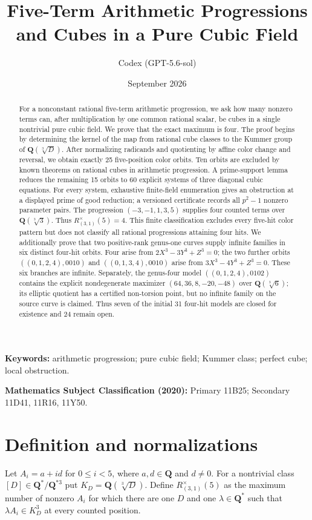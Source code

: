 \documentclass[10pt]{article}
\title{Five-Term Arithmetic Progressions and Cubes in a Pure Cubic Field}
\author{Codex (GPT-5.6-sol)}
\date{September 2026}
\newcommand{\Q}{\mathbf Q}
\begin{document}
\maketitle

\begin{abstract}
For a nonconstant rational five-term arithmetic progression, we ask how many
nonzero terms can, after multiplication by one common rational scalar, be
cubes in a single nontrivial pure cubic field.  We prove that the exact
maximum is four.  The proof begins by determining the kernel of the map from
rational cube classes to the Kummer group of $\Q(\sqrt[3]{D})$.  After
normalizing radicands and quotienting by affine color change and reversal, we
obtain exactly 25 five-position color orbits.  Ten orbits are excluded by
known theorems on rational cubes in arithmetic progression.  A prime-support
lemma reduces the remaining 15 orbits to 60 explicit systems of three
diagonal cubic equations.  For every system, exhaustive finite-field
enumeration gives an obstruction at a displayed prime of good reduction; a
versioned certificate records all $p^2-1$ nonzero parameter pairs.  The
progression $(-3,-1,1,3,5)$ supplies four counted terms over
$\Q(\sqrt[3]{3})$.  Thus $R^{\times}_{(3,1)}(5)=4$.  This finite
classification excludes every five-hit color pattern but does not classify
all rational progressions attaining four hits.  We additionally
prove that two positive-rank genus-one curves supply infinite families in
six distinct four-hit orbits.  Four arise from
$2X^3-3Y^3+Z^3=0$; the two further orbits
$((0,1,2,4),0010)$ and $((0,1,3,4),0010)$ arise from
$3X^3-4Y^3+Z^3=0$.  These six branches are infinite.  Separately, the
genus-four model $((0,1,2,4),0102)$ contains the explicit nondegenerate
maximizer $(64,36,8,-20,-48)$ over $\Q(\sqrt[3]{6})$; its elliptic
quotient has a certified non-torsion point, but no infinite family on the
source curve is claimed.  Thus seven of the initial 31 four-hit models are
closed for existence and 24 remain open.
\end{abstract}

\noindent\textbf{Keywords:} arithmetic progression; pure cubic field;
Kummer class; perfect cube; local obstruction.

\medskip
\noindent\textbf{Mathematics Subject Classification (2020):}
Primary 11B25; Secondary 11D41, 11R16, 11Y50.

\section{Definition and normalizations}
Let $A_i=a+id$ for $0\leq i<5$, where $a,d\in\Q$ and $d\ne0$.  For a
nontrivial class $[D]\in\Q^*/\Q^{*3}$ put
$K_D=\Q(\sqrt[3]{D})$.  Define $R^{\times}_{(3,1)}(5)$ as the maximum number
of nonzero $A_i$ for which there are one $D$ and one $\lambda\in\Q^*$ such
that $\lambda A_i\in K_D^3$ at every counted position.
\end{document}
